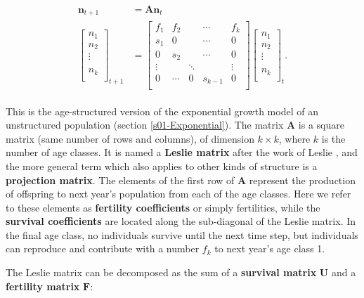 \documentclass[
]{book}
\begin{document}
\begin{align}
\begin{split}
\mathbf{n}_{t+1}&=\mathbf{A}\mathbf{n}_t\\
\left[\begin{matrix} n_1 \\n_2 \\ \vdots \\  \\ n_k   \\  \end{matrix}\right]_{t+1}&=\left[\begin{matrix} f_1 & f_2 && \cdots & f_k \\ s_1 &0 && \cdots &0\\ 0 &s_2 & &\cdots &0\\ \vdots& &\ddots&&\vdots\\ 0 &\cdots&0 & s_{k-1} &0  \\  \end{matrix}\right]\left[\begin{matrix} n_1 \\n_2 \\ \vdots \\  \\ n_k   \\  \end{matrix}\right]_{t}.
\end{split}
\label{eq:LeslieGrowth}
\end{align}

This is the age-structured version of the exponential growth model of an unstructured population (section \ref{s01-Exponential}). The matrix \(\mathbf{A}\) is a square matrix (same number of rows and columns), of dimension \(k \times k\), where \(k\) is the number of age classes. It is named a \textbf{Leslie matrix} after the work of Leslie \citetext{\citeyear{Leslie1}; \citeyear{Leslie2}}, and the more general term which also applies to other kinds of structure is a \textbf{projection matrix}. The elements of the first row of \(\mathbf{A}\) represent the production of offspring to next year's population from each of the age classes. Here we refer to these elements as \textbf{fertility coefficients} or simply fertilities, while the \textbf{survival coefficients} are located along the sub-diagonal of the Leslie matrix. In the final age class, no individuals survive until the next time step, but individuals can reproduce and contribute with a number \(f_k\) to next year's age class 1.

The Leslie matrix can be decomposed as the sum of a \textbf{survival matrix} \(\mathbf{U}\) and a \textbf{fertility matrix} \(\mathbf{F}\):
\end{document}
